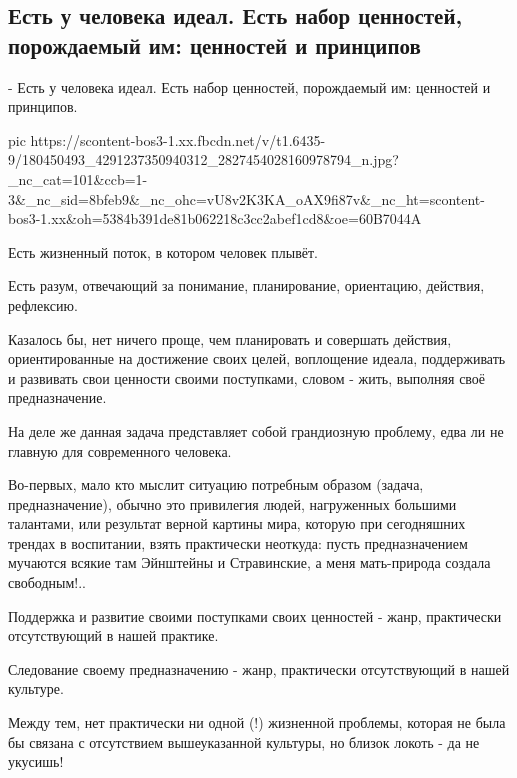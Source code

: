  
 
 
 
 
\subsection{Есть у человека идеал. Есть набор ценностей, порождаемый им: ценностей и принципов}

- Есть у человека идеал. Есть набор ценностей, порождаемый им: ценностей и принципов.

\ifcmt
  pic https://scontent-bos3-1.xx.fbcdn.net/v/t1.6435-9/180450493_4291237350940312_2827454028160978794_n.jpg?_nc_cat=101&ccb=1-3&_nc_sid=8bfeb9&_nc_ohc=vU8v2K3KA_oAX9fi87v&_nc_ht=scontent-bos3-1.xx&oh=5384b391de81b062218c3cc2abef1cd8&oe=60B7044A
\fi

Есть жизненный поток, в котором человек плывёт. 

Есть разум, отвечающий за понимание, планирование, ориентацию, действия,
рефлексию.

Казалось бы, нет ничего проще, чем планировать и совершать действия,
ориентированные на достижение своих целей, воплощение идеала, поддерживать и
развивать свои ценности своими поступками, словом - жить, выполняя своё
предназначение.

На деле же данная задача представляет собой грандиозную проблему, едва ли не
главную для современного человека.

Во-первых, мало кто мыслит ситуацию потребным образом (задача, предназначение),
обычно это привилегия людей, нагруженных большими талантами, или результат
верной картины мира, которую при сегодняшних трендах в воспитании, взять
практически неоткуда: пусть предназначением мучаются всякие там Эйнштейны и
Стравинские, а меня мать-природа создала свободным!..

Поддержка и развитие своими поступками своих ценностей - жанр, практически
отсутствующий в нашей практике. 

Следование своему предназначению - жанр, практически отсутствующий в нашей
культуре.

Между тем, нет практически ни одной (!) жизненной проблемы, которая не была бы
связана с отсутствием вышеуказанной культуры, но близок локоть - да не укусишь!

